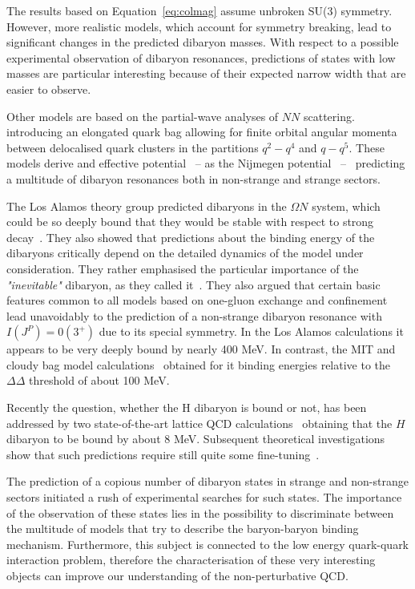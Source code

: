 The results based on Equation~\ref{eq:colmag} assume unbroken SU(3) symmetry.
However, more realistic models, which account for symmetry breaking, lead to significant changes
in the predicted dibaryon masses.
With respect to a possible experimental observation of dibaryon resonances, predictions of states
with low masses are particular interesting because of their expected narrow width that are easier
to observe.

Other models are based on the partial-wave analyses of $NN$ scattering.
introducing an elongated quark bag allowing for finite orbital angular momenta between
delocalised quark clusters in the partitions $q^{2}-q^{4}$ and $q-q^{5}$. 
These models derive and effective potential \ -- as the Nijmegen 
potential~\cite{dibpred1,dibpred2,dibpred3} -- \ predicting a multitude of dibaryon resonances
both in non-strange and strange sectors. 

The Los Alamos theory group predicted dibaryons in the $\Omega N$ system, which could be so
deeply bound that they would be stable with respect to strong 
decay~\cite{dsinevitable1,dsinevitable2}.
They also showed that predictions about the binding energy of the dibaryons critically depend
on the detailed dynamics of the model under consideration.
They rather emphasised the particular importance of the \textit{"inevitable"} \ds dibaryon, 
as they called it~\cite{dsinevitable1}.
They also argued that certain basic features common to all models based on one-gluon exchange
and confinement lead unavoidably to the prediction of a non-strange dibaryon resonance \ds 
with $I(J^{P}) = 0(3^{+})$ due to its special symmetry.
In the Los Alamos calculations it appears to be very deeply bound by nearly 400 MeV.
In contrast, the MIT and cloudy bag model calculations~\cite{dibpred2,dibpred5,dibpred6}
obtained for it binding energies relative to the
$\Delta \Delta$ threshold of about 100 MeV.

Recently the question, whether the H dibaryon is bound or not, has been addressed by two 
state-of-the-art lattice QCD calculations~\cite{Hlattice1,Hlattice2} obtaining
that the $H$ dibaryon to be bound by about 8 MeV.
Subsequent theoretical investigations show that such predictions require still quite some
fine-tuning~\cite{Hlattice3}.

The prediction of a copious number of dibaryon states in strange and non-strange sectors 
initiated a rush of experimental searches for such states. 
The importance of the observation of these states lies in the possibility to discriminate
between the multitude of models that try to describe the baryon-baryon binding mechanism.
Furthermore, this subject is connected to the low energy quark-quark interaction problem,
therefore the characterisation of these very interesting objects can improve our 
understanding of the non-perturbative QCD.

